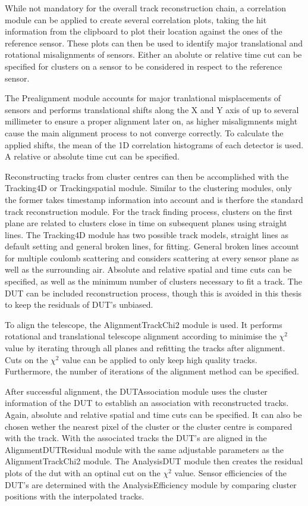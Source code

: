 While not mandatory for the overall track reconstruction chain, a correlation module can be applied to create several correlation plots, taking the hit information
from the clipboard to plot their location against the ones of the reference sensor. These plots can then be used to identify major translational and
rotational misalignments of sensors.  Either an abolute or relative time cut can be specified for clusters on a sensor to be considered in respect to
the reference sensor.

The Prealignment module accounts for major tranlational misplacements of sensors and performs translational shifts along the X and Y axis of up to several millimeter to ensure a proper alignment later on, as higher misaligmnents might cause the main alignment process to not converge correctly.
To calculate the applied shifts, the mean of the 1D correlation
histograms of each detector is used. A  relative or absolute time cut can be specified.

Reconstructing tracks from cluster centres can then be accomplished with the Tracking4D or Trackingspatial module. Similar to the clustering modules, only the former
takes timestamp information into account and is therfore the standard track reconstruction module. For the track finding process, clusters on the first plane are
related to clusters close in time on subsequent planes using straight lines.
The Tracking4D module has two possible track models, straight lines as default setting and general
broken lines, for fitting. General broken lines account for multiple coulomb scattering and considers scattering at every sensor plane as well as the surrounding air.
Absolute and relative spatial and time cuts can be specified, as well as the minimum number
of clusters necessary to fit a track. The DUT can be included reconstruction process, though this is avoided in this thesis to keep the residuals of DUT's unbiased.


To align the telescope, the AlignmentTrackChi2 module is used. It performs rotational and translational telescope
alignment according to minimise the $\chi^2$ value by iterating through all planes and refitting the tracks after alignment. Cuts on the $\chi^2$ value can be
applied to only keep high quality tracks. Furthermore, the number of iterations of the alignment method can be specified.

After successful alignment, the DUTAssociation module uses the cluster information of the DUT to establish an association with reconstructed tracks. Again, absolute
and relative spatial and time cuts can be specified. It can also be chosen wether the nearest pixel of the cluster or the cluster centre is compared with the track.
With the associated tracks the DUT's are aligned in the AlignmentDUTResidual module with the same adjustable parameters as the AlignmentTrackChi2 module.
The AnalysisDUT module then creates the residual plots of the dut with an optinal cut on the $\chi^2$ value. Sensor efficiencies of the DUT's are determined with the
AnalysisEfficiency module by comparing cluster positions with the interpolated tracks.


